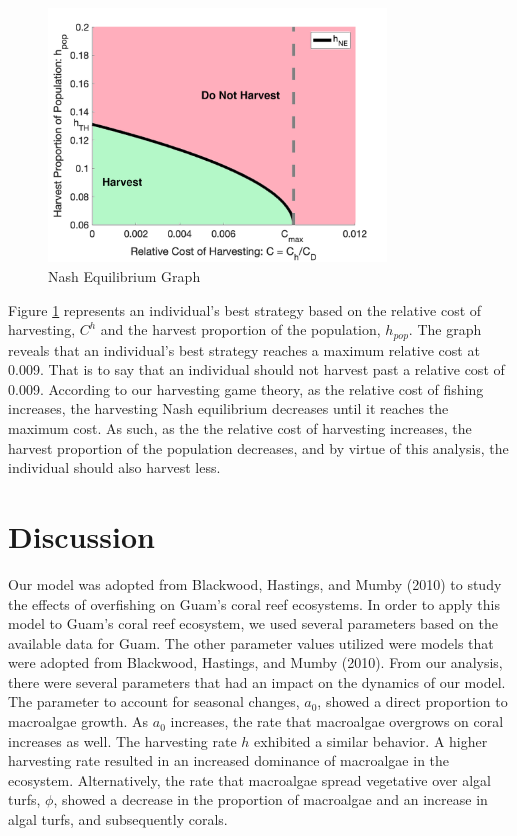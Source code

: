\documentclass[12pt]{article}
\begin{document}
\begin{figure}[H]
    \centering
    \includegraphics[width = 0.8\textwidth] {Latex/Figures/Graphs/nash_1.png}
    \caption{Nash Equilibrium Graph}
    \label{fig:NE_Graph}
\end{figure}

Figure \ref{fig:NE_Graph} represents an individual's best strategy based on the relative cost of harvesting, $C^{h}$ and the harvest proportion of the population, $h_{pop}$. The graph reveals that an individual's best strategy reaches a maximum relative cost at 0.009. That is to say that an individual should not harvest past a relative cost of 0.009. According to our harvesting game theory, as the relative cost of fishing increases, the harvesting Nash equilibrium decreases until it reaches the maximum cost. As such, as the the relative cost of harvesting increases, the harvest proportion of the population decreases, and by virtue of this analysis, the individual should also harvest less.


\section{Discussion}
Our model was adopted from Blackwood, Hastings, and Mumby (2010) to study the effects of overfishing on Guam's coral reef ecosystems. In order to apply this model to Guam's coral reef ecosystem, we used several parameters based on the available data for Guam. The other parameter values utilized were models that were adopted from Blackwood, Hastings, and Mumby (2010). From our analysis, there were several parameters that had an impact on the dynamics of our model. The parameter to account for seasonal changes, $a_{0}$, showed a direct proportion to macroalgae growth. As $a_{0}$ increases, the rate that macroalgae overgrows on coral increases as well. The harvesting rate $h$ exhibited a similar behavior. A higher harvesting rate resulted in an increased dominance of macroalgae in the ecosystem. Alternatively,  the rate that macroalgae spread vegetative over algal turfs, $\phi$, showed a decrease in the proportion of macroalgae and an increase in algal turfs, and subsequently corals.
\end{document}
